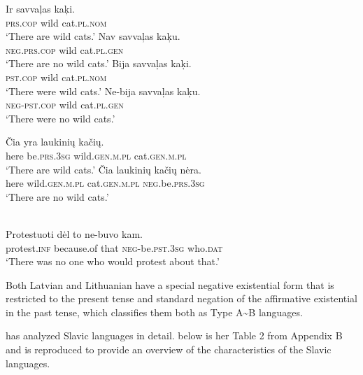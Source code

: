 \documentclass[output=paper,colorlinks,citecolor=brown]{langscibook}
\begin{document}
\begin{exe}\ex
{}
\begin{xlist}
\ex
\gll Ir savvaļas  kaķi. \\
\textsc{prs.cop} wild cat.\textsc{pl.nom} \\
    \glt `There are wild cats.'
\ex\label{ex:ieur-latvian-nowildcatsnow}
\gll Nav savvaļas kaķu.\\
\textsc{neg.prs.cop} wild cat.\textsc{pl.gen}\\
    \glt `There are no wild cats.'
\ex
\gll Bija      savvaļas kaķi.\\
\textsc{pst.cop} wild cat.\textsc{pl.nom}\\
    \glt `There were wild cats.'
\ex\label{ex:ieur-latvian-nowildcatspast}
\gll   Ne-bija savvaļas kaķu.\\
\textsc{neg}-\textsc{pst}.\textsc{cop} wild cat.\textsc{pl}.\textsc{gen}\\
    \glt `There were no wild cats.'
\end{xlist}
\ex{}
\begin{xlist}
\ex\gll Čia yra laukinių kačių. \\
here be.\textsc{prs.3sg} wild.\textsc{gen.m.pl} cat.\textsc{gen.m.pl}
\\
    \glt `There are wild cats.'
\ex\label{ex:ieur-lithuanian-nowildcatsnow}
\gll Čia  laukinių kačių nėra.\\
here wild.\textsc{gen.m.pl} cat.\textsc{gen.m.pl}
\textsc{neg}.be.\textsc{prs.3sg}\\
    \glt `There are no wild cats.'
\end{xlist}
\ex\label{ex:ieur-lithuanian-noprotest}
\\
    \gll Protestuoti dėl to ne-buvo kam.  \\
protest.\textsc{inf} because.of that
\textsc{neg}-be.\textsc{pst.3sg} who.\textsc{dat}\\
    \glt `There was no one who would protest about that.' 
\end{exe}
%
Both Latvian and Lithuanian have a special negative existential form that is restricted to the present tense and standard negation of the affirmative existential in the past tense, which classifies them both as Type A{\textasciitilde}B languages. 

\citet{Veselinova2014} has analyzed Slavic languages in detail.
 below is her Table 2 from Appendix B and is reproduced to
provide an overview of the characteristics of the Slavic languages.
\end{document}
